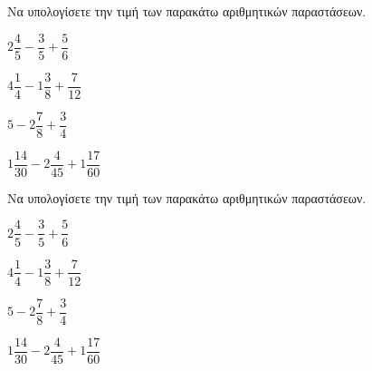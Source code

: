 Να υπολογίσετε την τιμή των παρακάτω αριθμητικών παραστάσεων.
\begin{multicols}{2}
\begin{rlist}
\item $ 2\dfrac{4}{5}-\dfrac{3}{5}+\dfrac{5}{6} $
\item $ 4\dfrac{1}{4}-1\dfrac{3}{8}+\dfrac{7}{12} $
\item $ 5-2\dfrac{7}{8}+\dfrac{3}{4} $
\item $ 1\dfrac{14}{30}-2\dfrac{4}{45}+1\dfrac{17}{60} $
\end{rlist}
\end{multicols}
Να υπολογίσετε την τιμή των παρακάτω αριθμητικών παραστάσεων.
\begin{multicols}{2}
\begin{rlist}
\item $ 2\dfrac{4}{5}-\dfrac{3}{5}+\dfrac{5}{6} $
\item $ 4\dfrac{1}{4}-1\dfrac{3}{8}+\dfrac{7}{12} $
\item $ 5-2\dfrac{7}{8}+\dfrac{3}{4} $
\item $ 1\dfrac{14}{30}-2\dfrac{4}{45}+1\dfrac{17}{60} $
\end{rlist}
\end{multicols}
